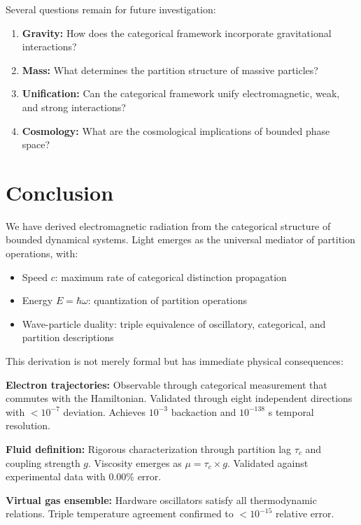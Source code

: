 \documentclass[aps,prl,twocolumn,superscriptaddress,floatfix]{revtex4-2}
\begin{document}
Several questions remain for future investigation:

\begin{enumerate}
\item \textbf{Gravity:} How does the categorical framework incorporate gravitational interactions?

\item \textbf{Mass:} What determines the partition structure of massive particles?

\item \textbf{Unification:} Can the categorical framework unify electromagnetic, weak, and strong interactions?

\item \textbf{Cosmology:} What are the cosmological implications of bounded phase space?
\end{enumerate}

\section{Conclusion}

We have derived electromagnetic radiation from the categorical structure of bounded dynamical systems. Light emerges as the universal mediator of partition operations, with:
\begin{itemize}
\item Speed $c$: maximum rate of categorical distinction propagation
\item Energy $E = \hbar\omega$: quantization of partition operations
\item Wave-particle duality: triple equivalence of oscillatory, categorical, and partition descriptions
\end{itemize}

This derivation is not merely formal but has immediate physical consequences:

\textbf{Electron trajectories:} Observable through categorical measurement that commutes with the Hamiltonian. Validated through eight independent directions with $<10^{-7}$ deviation. Achieves $10^{-3}$ backaction and $10^{-138}$ s temporal resolution.

\textbf{Fluid definition:} Rigorous characterization through partition lag $\tau_c$ and coupling strength $g$. Viscosity emerges as $\mu = \tau_c \times g$. Validated against experimental data with 0.00\% error.

\textbf{Virtual gas ensemble:} Hardware oscillators satisfy all thermodynamic relations. Triple temperature agreement confirmed to $<10^{-15}$ relative error.
\end{document}
